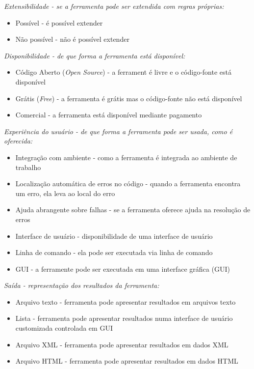 \begin{description}
  \item {\it Extensibilidade - se a ferramenta pode ser extendida com regras próprias:}
    \begin{itemize}
      \item Possível - é possível extender
      \item Não possível - não é possível extender
    \end{itemize}

  \item {\it Disponibilidade - de que forma a ferramenta está disponível:}
    \begin{itemize}
      \item Código Aberto ({\it Open Source}) - a ferrament é livre e o código-fonte está disponível
      \item Grátis ({\it Free}) - a ferramenta é grátis mas o código-fonte não está disponível
      \item Comercial - a ferramenta está disponível mediante pagamento
    \end{itemize}

  \item {\it Experiência do usuário - de que forma a ferramenta pode ser usada, como é oferecida:}
    \begin{itemize}
      \item Integração com ambiente - como a ferramenta é integrada ao ambiente de trabalho
      \item Localização automática de erros no código - quando a ferramenta encontra um erro, ela leva ao local do erro
      \item Ajuda abrangente sobre falhas - se a ferramenta oferece ajuda na resolução de erros
      \item Interface de usuário - disponibilidade de uma interface de usuário
      \item Linha de comando - ela pode ser executada via linha de comando
      \item GUI - a ferramente pode ser executada em uma interface gráfica (GUI)
    \end{itemize}

  \item {\it Saída - representação dos resultados da ferramenta:}
    \begin{itemize}
      \item Arquivo texto - ferramenta pode apresentar resultados em arquivos texto
      \item Lista - ferramenta pode apresentar resultados numa interface de usuário customizada controlada em GUI
      \item Arquivo XML - ferramenta pode apresentar resultados em dados XML
      \item Arquivo HTML - ferramenta pode apresentar resultados em dados HTML
    \end{itemize}

\end{description}

